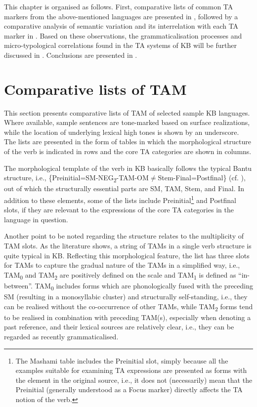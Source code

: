 \documentclass[output=paper]{langscibook}
\begin{document}
  This chapter is organised as follows. First, comparative lists of common TA markers from the above-mentioned languages are presented in , followed by a comparative analysis of semantic variation and its interrelation with each TA marker in . Based on these observations, the grammaticalisation processes and micro-typological correlations found in the TA systems of KB will be further discussed in . Conclusions are presented in .

\section{Comparative lists of TAM}\label{sec:shinagawa:2}

This section presents comparative lists of TAM of selected sample KB languages. Where available, sample sentences are tone-marked based on surface realizations, while the location of underlying lexical high tones is shown by an underscore. The lists are presented in the form of tables in which the morphological structure of the verb is indicated in rows and the core TA categories are shown in columns. 

The morphological template of the verb in KB basically follows the typical Bantu structure, i.e., \{Preinitial=SM-NEG\textsubscript{2}{}-TAM-OM${\neq}$Stem-Final=Postfinal\} (cf. \citealt{RoseEtAl2002}), out of which the structurally essential parts are SM, TAM, Stem, and Final. In addition to these elements, some of the lists include Preinitial\footnote{The Mashami table includes the Preinitial slot, simply because all the examples suitable for examining TA expressions are presented as forms with the element in the original source, i.e., it does not (necessarily) mean that the Preinitial (generally understood as a Focus marker) directly affects the TA notion of the verb.} and Postfinal slots, if they are relevant to the expressions of the core TA categories in the language in question.

Another point to be noted regarding the structure relates to the multiplicity of TAM slots. As the literature shows, a string of TAMs in a single verb structure is quite typical in KB. Reflecting this morphological feature, the list has three slots for TAMs to capture the gradual nature of the TAMs in a simplified way, i.e., TAM\textsubscript{0} and TAM\textsubscript{2} are positively defined on the scale and TAM\textsubscript{1} is defined as “in-between”. TAM\textsubscript{0} includes forms which are phonologically fused with the preceding SM (resulting in a monosyllabic cluster) and structurally self-standing, i.e., they can be realised without the co-occurrence of other TAMs, while TAM\textsubscript{2} forms tend to be realised in combination with preceding TAM(s), especially when denoting a past reference, and their lexical sources are relatively clear, i.e., they can be regarded as recently grammaticalised.
\end{document}
